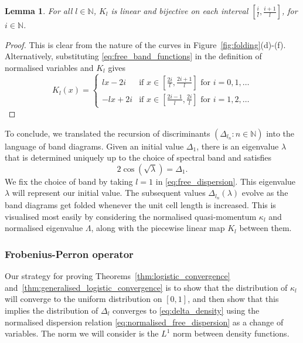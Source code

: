 \documentclass[a4paper]{article}
\newtheorem{lemma}[theorem]{Lemma}%
\theoremstyle{definition}
\numberwithin{equation}{section}
\numberwithin{theorem}{section}
\begin{document}
{\begin{lemma}
    For all $l\in\mathbb{N}$, $K_l$ is linear and bijective on each interval $[\frac{i}{l},\frac{i+1}{l}]$, for $i\in\mathbb{N}$.
\end{lemma}
\begin{proof}
    This is clear from the nature of the curves in Figure~\ref{fig:folding}(d)-(f). Alternatively, substituting \eqref{eq:free_band_functions} in the definition of normalised variables and $K_l$ gives
    \begin{equation} \label{eq:K_l}
        K_l(x)=\begin{cases}
        lx-2i & \text{if $x\in[\frac{2i}{l},\frac{2i+1}{l}]$ for $i=0,1,\dots$} \\
        -lx+2i & \text{if $x\in[\frac{2i-1}{l},\frac{2i}{l}]$ for $i=1,2,\dots$}
    \end{cases}
    \end{equation}
\end{proof}

To conclude, we translated the recursion of discriminants $(\Delta_{l_n}:n\in\mathbb{N})$ into the language of band diagrams. Given an initial value $\Delta_1$, there is an eigenvalue $\lambda$ that is determined uniquely up to the choice of spectral band and satisfies
\begin{equation} \label{eq:Lambda_Delta_relation}
    2\cos(\sqrt{\lambda})=\Delta_1.
\end{equation}
We fix the choice of band by taking $l=1$ in \eqref{eq:free_dispersion}. This eigenvalue $\lambda$ will represent our initial value. The subsequent values $\Delta_{l_n}(\lambda)$ evolve as the band diagrams get folded whenever the unit cell length is increased. This is visualised most easily by considering the normalised quasi-momentum $\kappa_l$ and normalised eigenvalue $\Lambda$, along with the piecewise linear map $K_l$ between them.

\subsubsection{Frobenius-Perron operator}

Our strategy for proving Theorems~\ref{thm:logistic_convergence} and~\ref{thm:generalised_logistic_convergence} is to show that the distribution of $\kappa_l$ will converge to the uniform distribution on $[0,1]$, and then show that this implies the distribution of $\Delta_l$ converges to \eqref{eq:delta_density} using the normalised dispersion relation \eqref{eq:normalised_free_dispersion} as a change of variables. The norm we will consider is the $ L^1$ norm between density functions.

}
\end{document}
